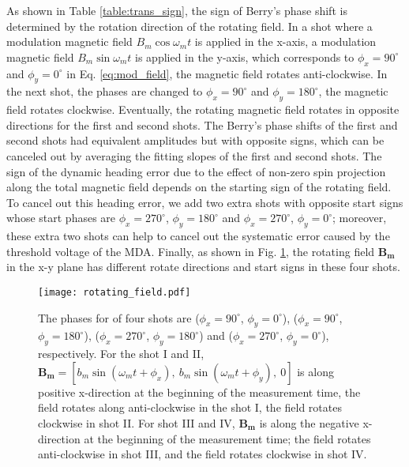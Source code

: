\documentclass[prx,twocolumn,10pt,nofootinbib]{revtex4-1}
\begin{document}
 
As shown in Table \ref{table:trans_sign}, the sign of Berry’s phase shift is determined by the rotation direction of the rotating field. In a shot where a modulation magnetic field $B_m\cos \omega_m t$ is applied in the x-axis, a modulation magnetic field $B_m\sin \omega_m t$ is applied in the y-axis, which corresponds to $\phi_x = 90^\circ$ and $\phi_y = 0^\circ$ in Eq. \ref{eq:mod_field}, the magnetic field rotates anti-clockwise. In the next shot, the phases are changed to $\phi_x = 90^\circ$ and $\phi_y = 180^\circ$, the magnetic field rotates clockwise. Eventually, the rotating magnetic field rotates in opposite directions for the first and second shots. The Berry’s phase shifts of the first and second shots had equivalent amplitudes but with opposite signs, which can be canceled out by averaging the fitting slopes of the first and second shots. The sign of the dynamic heading error due to the effect of non-zero spin projection along the total magnetic field depends on the starting sign of the rotating field. To cancel out this heading error, we add two extra shots with opposite start signs whose start phases are $\phi_x = 270^\circ$, $\phi_y = 180^\circ$ and $\phi_x = 270^\circ$, $\phi_y = 0^\circ$; moreover, these extra two shots can help to cancel out the systematic error caused by the threshold voltage of the MDA. Finally, as shown in Fig. \ref{fig:rotating_field}, the rotating field $\bm{B_m}$ in the x-y plane has different rotate directions and start signs in these four shots.

\begin{figure}
     \centering
     \texttt{[image: rotating\_field.pdf]}
     \caption{The phases for of four shots are ($\phi_x = 90^\circ$, $\phi_y = 0^\circ$), ($\phi_x = 90^\circ$, $\phi_y = 180^\circ$), ($\phi_x = 270^\circ$, $\phi_y = 180^\circ$) and ($\phi_x = 270^\circ$, $\phi_y = 0^\circ$), respectively. For the shot I and II, $\bm{B_m}=\left[b_m\sin(\omega_m t + \phi_x),~b_m\sin(\omega_m t + \phi_y),~0\right]$ is along positive x-direction at the beginning of the measurement time, the field rotates along anti-clockwise in the shot I, the field rotates clockwise in shot II. For shot III and IV, $\bm{B_m}$ is along the negative x-direction at the beginning of the measurement time; the field rotates anti-clockwise in shot III, and the field rotates clockwise in shot IV. }
     \label{fig:rotating_field}
 \end{figure}
 
\end{document}
